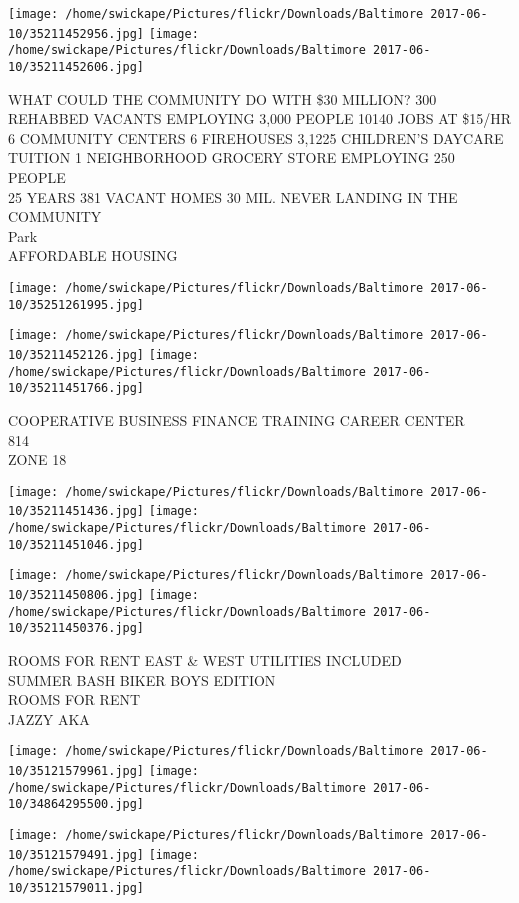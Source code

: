 \documentclass[10pt,letterpaper]{article}
\begin{document}
\texttt{[image: /home/swickape/Pictures/flickr/Downloads/Baltimore 2017-06-10/35211452956.jpg]}
\texttt{[image: /home/swickape/Pictures/flickr/Downloads/Baltimore 2017-06-10/35211452606.jpg]}

WHAT COULD THE COMMUNITY DO WITH \$30 MILLION?  300 REHABBED VACANTS EMPLOYING 3,000 PEOPLE 10140 JOBS AT \$15/HR 6 COMMUNITY CENTERS 6 FIREHOUSES 3,1225 CHILDREN'S DAYCARE TUITION 1 NEIGHBORHOOD GROCERY STORE EMPLOYING 250 PEOPLE\\
25 YEARS 381 VACANT HOMES 30 MIL. NEVER LANDING IN THE COMMUNITY\\
Park\\
AFFORDABLE HOUSING
\pagebreak

\texttt{[image: /home/swickape/Pictures/flickr/Downloads/Baltimore 2017-06-10/35251261995.jpg]}

\vspace{0.25in}
\texttt{[image: /home/swickape/Pictures/flickr/Downloads/Baltimore 2017-06-10/35211452126.jpg]}
\texttt{[image: /home/swickape/Pictures/flickr/Downloads/Baltimore 2017-06-10/35211451766.jpg]}

COOPERATIVE BUSINESS FINANCE TRAINING CAREER CENTER\\
814\\
ZONE 18
\pagebreak

\texttt{[image: /home/swickape/Pictures/flickr/Downloads/Baltimore 2017-06-10/35211451436.jpg]}
\texttt{[image: /home/swickape/Pictures/flickr/Downloads/Baltimore 2017-06-10/35211451046.jpg]}

\texttt{[image: /home/swickape/Pictures/flickr/Downloads/Baltimore 2017-06-10/35211450806.jpg]}
\texttt{[image: /home/swickape/Pictures/flickr/Downloads/Baltimore 2017-06-10/35211450376.jpg]}

ROOMS FOR RENT EAST \& WEST UTILITIES INCLUDED\\
SUMMER BASH BIKER BOYS EDITION\\
ROOMS FOR RENT\\
JAZZY AKA
\pagebreak

\texttt{[image: /home/swickape/Pictures/flickr/Downloads/Baltimore 2017-06-10/35121579961.jpg]}
\texttt{[image: /home/swickape/Pictures/flickr/Downloads/Baltimore 2017-06-10/34864295500.jpg]}

\texttt{[image: /home/swickape/Pictures/flickr/Downloads/Baltimore 2017-06-10/35121579491.jpg]}
\texttt{[image: /home/swickape/Pictures/flickr/Downloads/Baltimore 2017-06-10/35121579011.jpg]}
\end{document}
